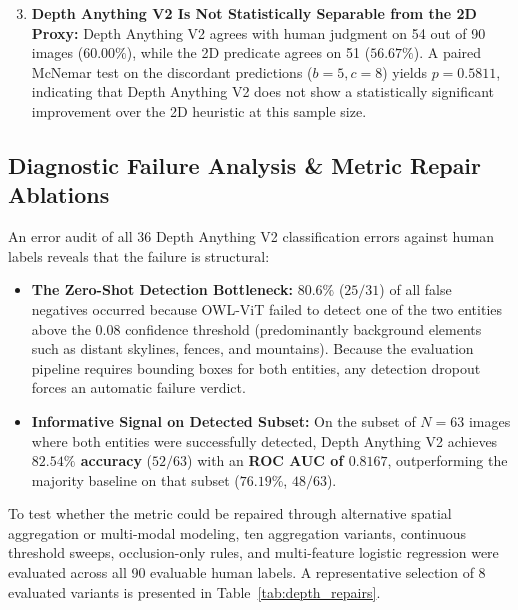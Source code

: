 \documentclass[10pt,twocolumn,letterpaper]{article}
\begin{document}
\begin{enumerate}
\setcounter{enumi}{2}
    \item \textbf{Depth Anything V2 Is Not Statistically Separable from the 2D Proxy:} Depth Anything V2 agrees with human judgment on 54 out of 90 images ($60.00\%$), while the 2D predicate agrees on 51 ($56.67\%$). A paired McNemar test on the discordant predictions ($b=5, c=8$) yields \textbf{$p = 0.5811$}, indicating that Depth Anything V2 does not show a statistically significant improvement over the 2D heuristic at this sample size.
\end{enumerate}

\subsection{Diagnostic Failure Analysis \& Metric Repair Ablations}
An error audit of all 36 Depth Anything V2 classification errors against human labels reveals that the failure is structural:
\begin{itemize}
    \item \textbf{The Zero-Shot Detection Bottleneck:} $80.6\%$ ($25 / 31$) of all false negatives occurred because OWL-ViT failed to detect one of the two entities above the $0.08$ confidence threshold (predominantly background elements such as distant skylines, fences, and mountains). Because the evaluation pipeline requires bounding boxes for both entities, any detection dropout forces an automatic failure verdict.
    \item \textbf{Informative Signal on Detected Subset:} On the subset of $N = 63$ images where both entities were successfully detected, Depth Anything V2 achieves \textbf{$82.54\%$ accuracy} ($52/63$) with an \textbf{ROC AUC of $0.8167$}, outperforming the majority baseline on that subset ($76.19\%$, $48/63$).
\end{itemize}

To test whether the metric could be repaired through alternative spatial aggregation or multi-modal modeling, ten aggregation variants, continuous threshold sweeps, occlusion-only rules, and multi-feature logistic regression were evaluated across all 90 evaluable human labels. A representative selection of 8 evaluated variants is presented in Table~\ref{tab:depth_repairs}.
\end{document}
